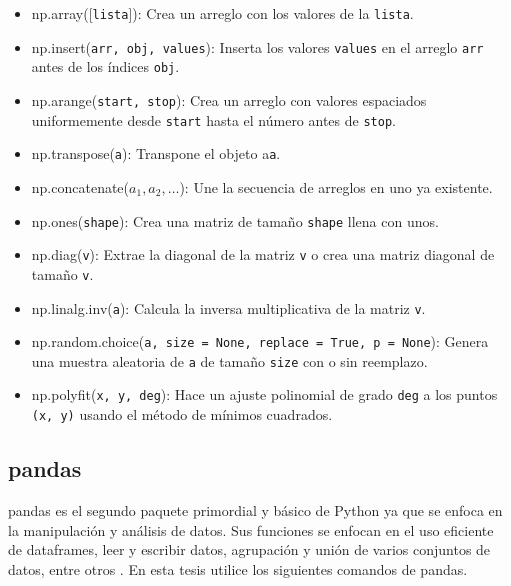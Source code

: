 \begin{itemize}
	\item np.array([\texttt{lista}]): Crea un arreglo con los valores de la \texttt{lista}.
	
	\item np.insert(\texttt{arr, obj, values}): Inserta los valores \texttt{values} en el arreglo \texttt{arr} antes de los índices \texttt{obj}.
	
	\item np.arange(\texttt{start, stop}): Crea un arreglo con valores espaciados uniformemente desde \texttt{start} hasta el número antes de \texttt{stop}. 
	
	\item np.transpose(\texttt{a}): Transpone el objeto a\texttt{a}.
	
	\item np.concatenate($a_1, a_2, \dots $): Une la secuencia de arreglos en uno ya existente.
	
	\item np.ones(\texttt{shape}): Crea una matriz de tamaño \texttt{shape} llena con unos.
	
	\item np.diag(\texttt{v}): Extrae la diagonal de la matriz \texttt{v} o crea una matriz diagonal de tamaño \texttt{v}.
	
	\item np.linalg.inv(\texttt{a}): Calcula la inversa multiplicativa de la matriz \texttt{v}. 
	
	\item np.random.choice(\texttt{a, size = None, replace = True, p = None}): Genera una muestra aleatoria de \texttt{a} de tamaño \texttt{size} con o sin reemplazo. 
	
	\item np.polyfit(\texttt{x, y, deg}): Hace un ajuste polinomial de grado \texttt{deg} a los puntos \texttt{(x, y)} usando el método de mínimos cuadrados. 
	
\end{itemize}


\subsection{pandas}
pandas es el segundo paquete primordial y básico de \textsf{Python} ya que se enfoca en la manipulación y análisis de datos. Sus funciones se enfocan en el uso eficiente de dataframes, leer y escribir datos, agrupación y unión de varios conjuntos de datos, entre otros \cite{pandas_manual}. En esta tesis utilice los siguientes comandos de pandas. 


